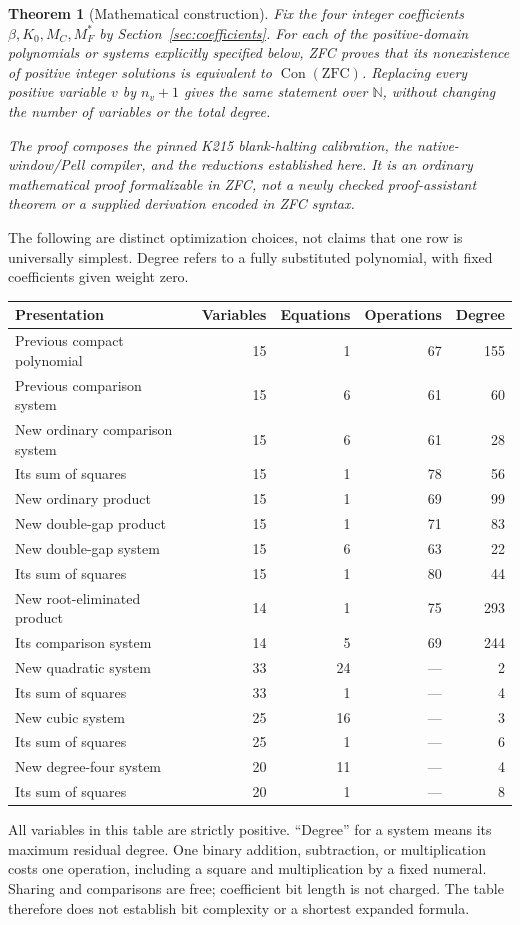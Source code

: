 \documentclass[11pt]{article}
\newcommand{\N}{\mathbb N}
\newcommand{\Con}{\operatorname{Con}}
\newtheorem{theorem}{Theorem}
\begin{document}
\begin{theorem}[Mathematical construction]\label{thm:main}
Fix the four integer coefficients $\beta,K_0,M_C,M_F^*$ by Section~\ref{sec:coefficients}. For each of the positive-domain polynomials or systems explicitly specified below, ZFC proves that its nonexistence of positive integer solutions is equivalent to $\Con(\mathrm{ZFC})$. Replacing every positive variable $v$ by $n_v+1$ gives the same statement over $\N$, without changing the number of variables or the total degree.

The proof composes the pinned K215 blank-halting calibration, the native-window/Pell compiler, and the reductions established here. It is an ordinary mathematical proof formalizable in ZFC, not a newly checked proof-assistant theorem or a supplied derivation encoded in ZFC syntax.
\end{theorem}

The following are distinct optimization choices, not claims that one row is universally simplest. Degree refers to a fully substituted polynomial, with fixed coefficients given weight zero.
\begin{center}
\small
\begin{tabular}{@{}lrrrr@{}}
\toprule
Presentation & Variables & Equations & Operations & Degree\\
\midrule
Previous compact polynomial & 15 & 1 & 67 & 155\\
Previous comparison system & 15 & 6 & 61 & 60\\
New ordinary comparison system & 15 & 6 & 61 & 28\\
Its sum of squares & 15 & 1 & 78 & 56\\
New ordinary product & 15 & 1 & 69 & 99\\
New double-gap product & 15 & 1 & 71 & 83\\
New double-gap system & 15 & 6 & 63 & 22\\
Its sum of squares & 15 & 1 & 80 & 44\\
New root-eliminated product & 14 & 1 & 75 & 293\\
Its comparison system & 14 & 5 & 69 & 244\\
New quadratic system & 33 & 24 & --- & 2\\
Its sum of squares & 33 & 1 & --- & 4\\
New cubic system & 25 & 16 & --- & 3\\
Its sum of squares & 25 & 1 & --- & 6\\
New degree-four system & 20 & 11 & --- & 4\\
Its sum of squares & 20 & 1 & --- & 8\\
\bottomrule
\end{tabular}
\end{center}
All variables in this table are strictly positive. ``Degree'' for a system means its maximum residual degree. One binary addition, subtraction, or multiplication costs one operation, including a square and multiplication by a fixed numeral. Sharing and comparisons are free; coefficient bit length is not charged. The table therefore does not establish bit complexity or a shortest expanded formula.
\end{document}
